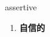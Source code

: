 
\begin{frame}
{\huge assertive}
\begin{center}
\begin{enumerate}\Large
  \item \textbf{自信的}
\end{enumerate}
\end{center}
\end{frame}
